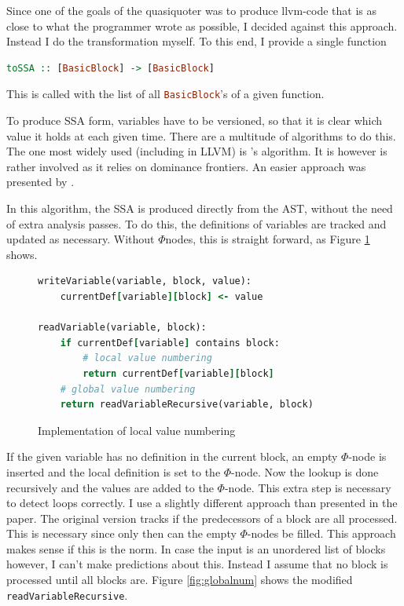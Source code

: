 \documentclass[a4paper,bibliography=totocnumbered,parskip,headsepline]{scrbook}
\begin{document}
Since one of the goals of the quasiquoter was to produce llvm-code that is as close to what the programmer wrote as possible, I decided against this approach.
Instead I do the transformation myself.
To this end, I provide a single function

\begin{lstlisting}[language=haskell]
toSSA :: [BasicBlock] -> [BasicBlock]
\end{lstlisting}

This is called with the list of all \lstinline[language=haskell]!BasicBlock!'s of a given function.

To produce SSA form, variables have to be versioned, so that it is clear which value it holds at each given time.
There are a multitude of algorithms to do this.
The one most widely used (including in LLVM) is \citeauthor{cytron91efficiently}'s algorithm.
It is however is rather involved as it relies on dominance frontiers.
An easier approach was presented by \citeauthor{braun13simple}.

In this algorithm, the SSA is produced directly from the AST, without the need of extra analysis passes.
To do this, the definitions of variables are tracked and updated as necessary.
Without $\Phi$nodes, this is straight forward, as Figure \ref{fig:localnum} shows.

\begin{figure}
\begin{lstlisting}[language=ruby]
writeVariable(variable, block, value):
    currentDef[variable][block] <- value

readVariable(variable, block):
    if currentDef[variable] contains block:
        # local value numbering
        return currentDef[variable][block]
    # global value numbering
    return readVariableRecursive(variable, block)
\end{lstlisting}
\caption{Implementation of local value numbering}
\label{fig:localnum}
\end{figure}

If the given variable has no definition in the current block, an empty $\Phi$-node is inserted and the local definition is set to the $\Phi$-node.
Now the lookup is done recursively and the values are added to the $\Phi$-node.
This extra step is necessary to detect loops correctly.
I use a slightly different approach than presented in the paper.
The original version tracks if the predecessors of a block are all processed.
This is necessary since only then can the empty $\Phi$-nodes be filled.
This approach makes sense if this is the norm.
In case the input is an unordered list of blocks however, I can't make predictions about this.
Instead I assume that no block is processed until all blocks are.
Figure \ref{fig:globalnum} shows the modified \lstinline[language=haskell]!readVariableRecursive!.
\end{document}
